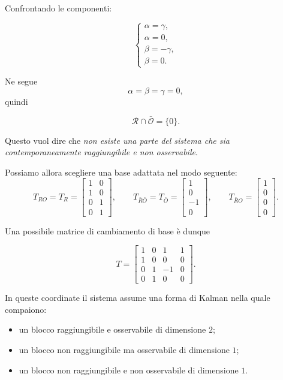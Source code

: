 Confrontando le componenti:

\[
\begin{cases}
\alpha=\gamma,\\
\alpha=0,\\
\beta=-\gamma,\\
\beta=0.
\end{cases}
\]

Ne segue
\[
\alpha=\beta=\gamma=0,
\]
quindi

\[
\mathcal R\cap\bar{\mathcal O}=\{0\}.
\]

Questo vuol dire che \emph{non esiste una parte del sistema che sia contemporaneamente raggiungibile e non osservabile}.

\medskip

Possiamo allora scegliere una base adattata nel modo seguente:
\[
T_{RO}=T_R
=
\begin{bmatrix}
1 & 0\\
1 & 0\\
0 & 1\\
0 & 1
\end{bmatrix},
\qquad
T_{\bar R\bar O}=T_{\bar O}
=
\begin{bmatrix}
1\\
0\\
-1\\
0
\end{bmatrix},
\qquad
T_{\bar R O}=
\begin{bmatrix}
1\\0\\0\\0
\end{bmatrix}.
\]

Una possibile matrice di cambiamento di base è dunque

\[
T=
\begin{bmatrix}
1 & 0 & 1 & 1\\
1 & 0 & 0 & 0\\
0 & 1 & -1 & 0\\
0 & 1 & 0 & 0
\end{bmatrix}.
\]

In queste coordinate il sistema assume una forma di Kalman nella quale compaiono:
\begin{itemize}
    \item un blocco raggiungibile e osservabile di dimensione \(2\);
    \item un blocco non raggiungibile ma osservabile di dimensione \(1\);
    \item un blocco non raggiungibile e non osservabile di dimensione \(1\).
\end{itemize}

